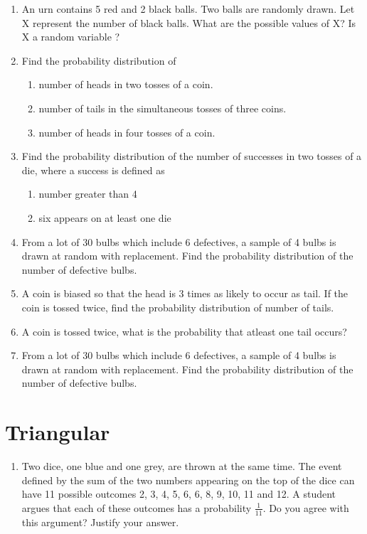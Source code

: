 \begin{enumerate}[label=\thesection.\arabic*,ref=\thesection.\theenumi]
\item An urn contains 5 red and 2 black balls. Two balls are randomly drawn. Let X
represent the number of black balls. What are the possible values of X? Is X a
random variable ? 
\item Find the probability distribution of
\begin{enumerate}
\item number of heads in two tosses of a coin.
\item number of tails in the simultaneous tosses of three coins.
\item number of heads in four tosses of a coin.
\end{enumerate}

\item Find the probability distribution of the number of successes in two tosses of a die,
where a success is defined as
\begin{enumerate}
\item number greater than 4
\item six appears on at least one die
\end{enumerate}
\item From a lot of 30 bulbs which include 6 defectives, a sample of 4 bulbs is drawn
at random with replacement. Find the probability distribution of the number of
defective bulbs.
\item A coin is biased so that the head is 3 times as likely to occur as tail. If the coin is
tossed twice, find the probability distribution of number of tails.
\item A coin is tossed twice, what is the probability that atleast one tail occurs?
\\
\solution

\item From a lot of 30 bulbs which include 6 defectives, a sample of 4 bulbs is drawn
at random with replacement. Find the probability distribution of the number of
defective bulbs.
 
    \end{enumerate}
    \section{Triangular}
\begin{enumerate}[label=\thesection.\arabic*,ref=\thesection.\theenumi]
	\item Two dice, one blue and one grey, are thrown at the same time.   The event defined by the sum of the two numbers appearing on the top of the dice can have 11 possible outcomes 2, 3, 4, 5, 6, 6, 8, 9, 10, 11 and 12.  A student argues that each of these outcomes has a probability $\frac{1}{11}$.  Do you agree with this argument?  Justify your answer.
    \end{enumerate}
